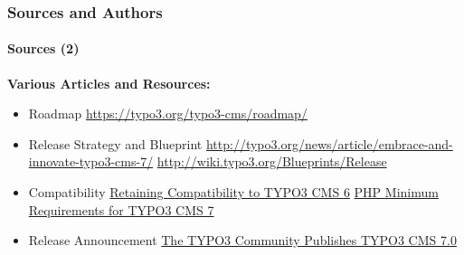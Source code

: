 \begin{frame}[fragile]
	\frametitle{Sources and Authors}
	\framesubtitle{Sources (2)}

	\textbf{Various Articles and Resources:}
	\begin{itemize}\smaller

		\item Roadmap\newline
			\url{https://typo3.org/typo3-cms/roadmap/}
		\item Release Strategy and Blueprint\newline
			\url{http://typo3.org/news/article/embrace-and-innovate-typo3-cms-7/}
			\url{http://wiki.typo3.org/Blueprints/Release}
		\item Compatibility\newline
			\href{http://typo3.org/news/article/retaining-compatibility-to-typo3-cms6/}{Retaining Compatibility to TYPO3 CMS 6}\newline
			\href{http://typo3.org/news/article/php-minimum-requirements-for-typo3-cms-7/}{PHP Minimum Requirements for TYPO3 CMS 7}
		\item Release Announcement\newline
			\href{http://typo3.org/news/article/the-typo3-community-publishes-typo3-cms-70-a-new-version-of-its-free-content-management-system/}{The TYPO3 Community Publishes TYPO3 CMS 7.0}

	\end{itemize}

\end{frame}


